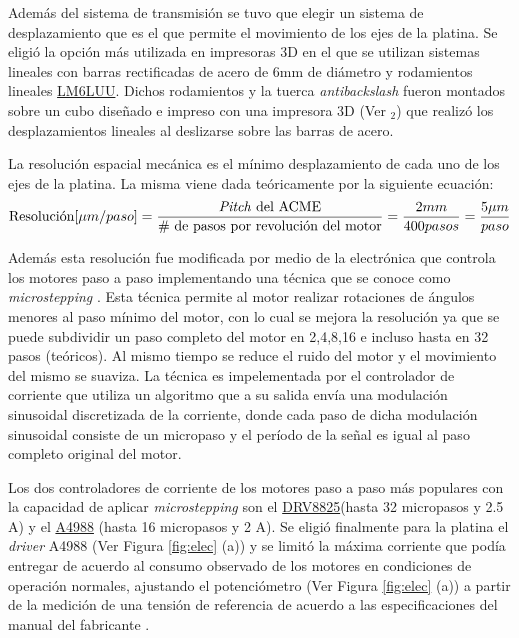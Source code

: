 Además del sistema de transmisión se tuvo que elegir un sistema de desplazamiento que es el que permite el movimiento de los ejes de la platina. Se eligió la opción más utilizada en impresoras 3D en el que se utilizan sistemas lineales con barras rectificadas de acero de 6mm de diámetro y rodamientos lineales \href{https://uk.misumi-ec.com/vona2/detail/221000091678/?HissuCode=LM6LUU}{LM6LUU}. Dichos rodamientos y la tuerca \textit{antibackslash} fueron montados sobre un cubo diseñado e impreso con una impresora 3D (Ver \href{https://github.com/jrr1984/open_frame_XYStage/blob/master/3dprintedparts/STLs/cuboconLM6UU_2demarzo.STL}{\faCubes$_{2}$}) que realizó los desplazamientos lineales al deslizarse sobre las barras de acero.

La resolución espacial mecánica es el mínimo desplazamiento de cada uno de los ejes de la platina. La misma viene dada teóricamente por la siguiente ecuación:
\begin{equation}
\text{Resolución} [\mu m / paso] = \frac{\text{\textit{Pitch} del ACME}}{\text{\# de pasos por revolución del motor}} = \frac{2 mm}{400 pasos} = \frac{5 \mu m}{paso}
\end{equation}

Además esta resolución fue modificada por medio de la electrónica que controla los motores paso a paso implementando una técnica que se conoce como \textit{microstepping} \cite{7806244}. Esta técnica permite al motor realizar rotaciones de ángulos menores al paso mínimo del motor, con lo cual se mejora la resolución ya que se puede subdividir un paso completo del motor en 2,4,8,16 e incluso hasta en 32 pasos (teóricos). Al mismo tiempo se reduce el ruido del motor y el movimiento del mismo se suaviza. La técnica es impelementada por el controlador de corriente que utiliza un algoritmo que a su salida envía una modulación sinusoidal discretizada de la corriente, donde cada paso de dicha modulación sinusoidal consiste de un micropaso y el período de la señal es igual al paso completo original del motor.

Los dos controladores de corriente de los motores paso a paso más populares con la capacidad de aplicar \textit{microstepping} son el \href{https://www.pololu.com/product/2133}{DRV8825}(hasta 32 micropasos y 2.5 A) y el \href{https://www.pololu.com/product/1182}{A4988} (hasta 16 micropasos y 2 A). Se eligió finalmente para la platina el \textit{driver} A4988 (Ver Figura \ref{fig:elec} (a)) y se limitó la máxima corriente que podía entregar de acuerdo al consumo observado de los motores en condiciones de operación normales, ajustando el potenciómetro (Ver Figura \ref{fig:elec} (a)) a partir de la medición de una tensión de referencia de acuerdo a las especificaciones del manual del fabricante \cite{a4988}.

